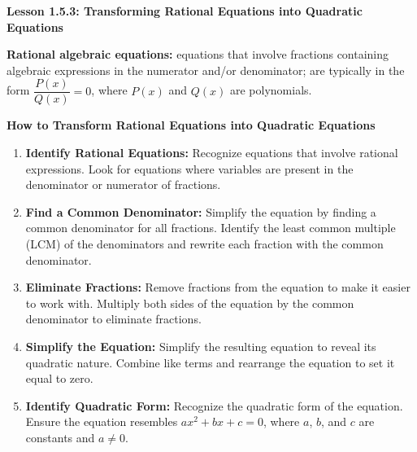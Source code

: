 \begin{center}
\textbf{Lesson 1.5.3: Transforming Rational Equations into Quadratic Equations}
\end{center}

\textbf{Rational algebraic equations:} equations that involve fractions containing algebraic expressions in the numerator and/or denominator; are typically in the form \( \dfrac{P(x)}{Q(x)} = 0 \), where \( P(x) \) and \( Q(x) \) are polynomials.

\textbf{How to Transform Rational Equations into Quadratic Equations}

\begin{enumerate}[label = \color{blue}\arabic*. ]
\item \textbf{Identify Rational Equations:} Recognize equations that involve rational expressions. Look for equations where variables are present in the denominator or numerator of fractions.
\item \textbf{Find a Common Denominator:} Simplify the equation by finding a common denominator for all fractions. Identify the least common multiple (LCM) of the denominators and rewrite each fraction with the common denominator.
\item \textbf{Eliminate Fractions:} Remove fractions from the equation to make it easier to work with. Multiply both sides of the equation by the common denominator to eliminate fractions.
\item \textbf{Simplify the Equation:} Simplify the resulting equation to reveal its quadratic nature. Combine like terms and rearrange the equation to set it equal to zero.
\item \textbf{Identify Quadratic Form:} Recognize the quadratic form of the equation. Ensure the equation resembles $ ax^2 + bx + c = 0 $, where $ a $, $ b $, and $ c $ are constants and $ a \neq 0 $.
\end{enumerate}



